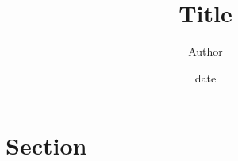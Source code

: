 \documentclass[11pt,a4paper]{article}
\author{Author}
\title{\textbf{Title}}
\date{date}
\begin{document}

\maketitle
\tableofcontents
\newpage

\section{Section}



% 
% 
\end{document}
